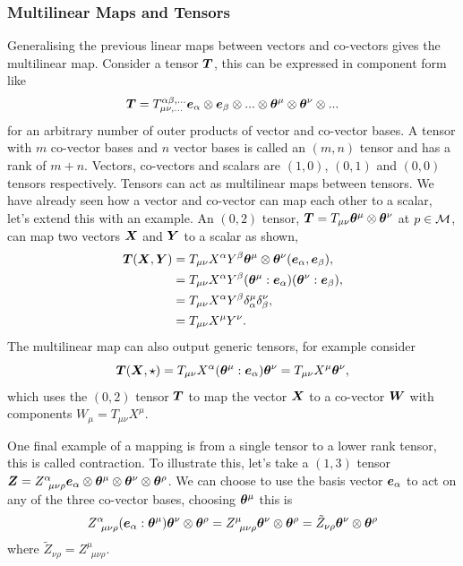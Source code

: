 \subsubsection{Multilinear Maps and Tensors}
Generalising the previous linear maps between vectors and co-vectors gives the multilinear map. Consider a tensor $\boldsymbol{T}$, this can be expressed in component form like 
\begin{equation}\boldsymbol{T} = T^{\alpha\beta, ...}_{\mu\nu,...} \boldsymbol{e}_\alpha\otimes\boldsymbol{e}_\beta \otimes... \otimes\boldsymbol{\theta}^\mu \otimes\boldsymbol{\theta}^\nu\otimes...
\end{equation}
for an arbitrary number of outer products of vector and co-vector bases. A tensor with $m$ co-vector bases and $n$ vector bases is called an $(m,n)$ tensor and has a rank of $m+n$. Vectors, co-vectors and scalars are $(1,0)$, $(0,1)$ and $(0,0)$ tensors respectively.  Tensors can act as multilinear maps between tensors. We have already seen how a vector and co-vector can map each other to a scalar, let's extend this with an example. An $(0,2)$ tensor, $\boldsymbol{T}=T_{\mu\nu}\boldsymbol{\theta}^\mu\otimes\boldsymbol{\theta}^\nu$ at $p\in\mathcal{M}$, can map two vectors $\boldsymbol{X}$ and $\boldsymbol{Y}$ to a scalar as shown, 
\begin{align}
\boldsymbol{T}(\boldsymbol{X},\boldsymbol{Y}) 
&=T_{\mu\nu}X^\alpha Y^\beta \boldsymbol{\theta}^\mu \otimes \boldsymbol{\theta}^\nu (\boldsymbol{e}_\alpha,\boldsymbol{e}_\beta),\\
&= T_{\mu\nu}X^\alpha Y^\beta (\boldsymbol{\theta}^\mu:\boldsymbol{e}_\alpha)( \boldsymbol{\theta}^\nu:\boldsymbol{e}_\beta) ,\\
&= T_{\mu\nu}X^\alpha Y^\beta \delta^\mu_\alpha  \delta^\nu_\beta ,\\
&= T_{\mu\nu}X^\mu Y^\nu.
\end{align}
The multilinear map can also output generic tensors, for example consider 
\begin{equation}
\boldsymbol{T}(\boldsymbol{X},\star) = T_{\mu\nu} X^\alpha (\boldsymbol{\theta}^\mu:\boldsymbol{e}_\alpha)\boldsymbol{\theta}^\nu = T_{\mu\nu}X^\mu \boldsymbol{\theta}^\nu,
\end{equation}
which uses the $(0,2)$ tensor $\boldsymbol{T}$ to map the vector $\boldsymbol{X}$ to a co-vector $\boldsymbol{W}$ with components $W_\mu = T_{\mu\nu}X^\mu$.

One final example of a mapping is from a single tensor to a lower rank tensor, this is called contraction. To illustrate this, let's take a $(1,3)$ tensor $\boldsymbol{Z} = Z^\alpha_{\,\,\,\mu\nu\rho} \boldsymbol{e}_\alpha \otimes\boldsymbol{\theta}^\mu\otimes\boldsymbol{\theta}^\nu\otimes\boldsymbol{\theta}^\rho$. We can choose to use the basis vector $\boldsymbol{e}_\alpha$ to act on any of the three co-vector bases, choosing $\boldsymbol{\theta}^\mu$ this is
\begin{equation}
Z^\alpha_{\,\,\,\mu\nu\rho} (\boldsymbol{e}_\alpha : \boldsymbol{\theta}^\mu)\boldsymbol{\theta}^\nu\otimes\boldsymbol{\theta}^\rho = Z^\mu_{\,\,\,\mu\nu\rho}\boldsymbol{\theta}^\nu\otimes\boldsymbol{\theta}^\rho = \tilde{Z}_{\nu\rho}\boldsymbol{\theta}^\nu\otimes\boldsymbol{\theta}^\rho
\end{equation} 
where $\tilde{Z}_{\nu\rho} = Z^\mu_{\,\,\,\mu\nu\rho}$.






